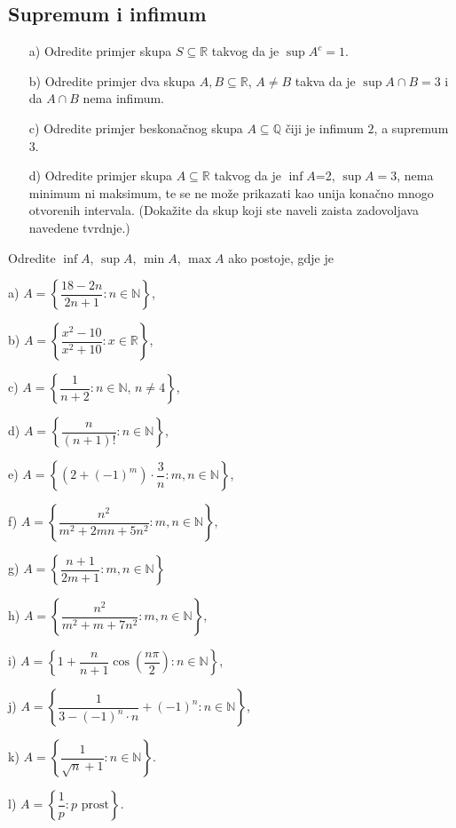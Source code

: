 \subsection*{Supremum i infimum}
\begin{exercise}\textbf{}
\begin{itemize}
\item[a)] Odredite primjer skupa $S\subseteq \mathbb{R}$ takvog da je $\sup{A^c}=1$.
\item[b)] Odredite primjer dva skupa $A, B\subseteq \mathbb{R}$, $A\neq B$ takva da je $\sup{A\cap B}=3$ i da $A\cap B$ nema infimum.
\item[c)] Odredite primjer beskonačnog skupa $A\subseteq \mathbb{Q}$ čiji je infimum $2$, a supremum $3$.
\item[d)] Odredite primjer skupa $A\subseteq \mathbb{R}$ takvog da je $\inf{A}$=2, $\sup{A}=3$, nema minimum ni maksimum, te se ne može prikazati kao unija konačno mnogo otvorenih intervala. (Dokažite da skup koji ste naveli zaista zadovoljava navedene tvrdnje.)
\end{itemize}
\end{exercise}
\begin{exercise}
Odredite $\inf{A}$, $\sup{A}$, $\min{A}$, $\max{A}$ ako postoje, gdje je
\begin{AutoMultiColItemize}
\item[a)] $A=\left\{\dfrac{18-2n}{2n+1} : n\in \mathbb{N}\right\}$,
\item[b)] $A=\left\{\dfrac{x^2-10}{x^2+10} : x\in \mathbb{R}\right\}$,
\item[c)] $A=\left\{\dfrac{1}{n+2} : n\in \mathbb{N},\, n\neq 4\right\}$,
\item[d)] $A=\left\{\dfrac{n}{(n+1)!} : n\in \mathbb{N}\right\}$,
\item[e)] $A=\left\{(2+(-1)^m)\cdot \dfrac{3}{n} : m, n\in \mathbb{N}\right\}$, 
\item[f)] $A=\left\{\dfrac{n^2}{m^2+2mn+5n^2} : m, n\in \mathbb{N}\right\}$,
\item[g)] $A=\left\{\dfrac{n+1}{2m+1} : m, n\in \mathbb{N}\right\}$
\item[h)] $A=\left\{\dfrac{n^2}{m^2+m+7n^2} : m, n\in \mathbb{N}\right\}$,
\item[i)] $A=\left\{1+\dfrac{n}{n+1}\cos\left(\dfrac{n\pi}{2}\right) : n\in \mathbb{N}\right\}$,
\item[j)] $A=\left\{\dfrac{1}{3-\left(-1\right)^{n}\cdot n}+\left(-1\right)^{n} : n\in \mathbb{N}\right\}$,
\item[k)] $A=\left\{\dfrac{1}{\sqrt{n}+1} : n\in \mathbb{N}\right\}$.
\item[l)] $A=\left\{\dfrac{1}{p} : p\text{ prost}\right\}$.
\end{AutoMultiColItemize}
\end{exercise}

